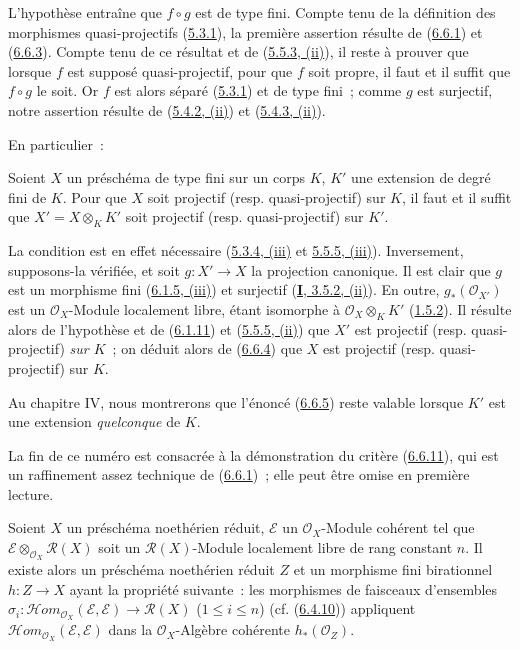 L'hypothèse entraîne que $f\circ g$ est de type fini. Compte tenu de la
définition des morphismes quasi-projectifs
(\hyperref[II.5.3.1-fr]{5.3.1}), la première assertion résulte de
(\hyperref[II.6.6.1-fr]{6.6.1}) et
(\hyperref[II.6.6.3-fr]{6.6.3}). Compte tenu de ce résultat et de
(\hyperref[II.5.5.3-fr]{5.5.3, (ii)}), il reste à prouver que lorsque $f$ est
supposé quasi-projectif, pour que $f$ soit propre, il faut et il suffit que
$f\circ g$ le soit. Or $f$ est alors séparé
(\hyperref[II.5.3.1-fr]{5.3.1}) et de type fini~; comme $g$ est surjectif,
notre assertion résulte de (\hyperref[II.5.4.2-fr]{5.4.2, (ii)}) et
(\hyperref[II.5.4.3-fr]{5.4.3, (ii)}).

En particulier~:

\begin{corollary}[6.6.5]
\label{II.6.6.5-fr}
Soient $X$ un préschéma de type fini sur un corps $K$, $K'$ une extension de
degré fini de $K$. Pour que $X$ soit projectif \textup{(resp.} quasi-projectif\textup{)} sur
$K$, il faut et il suffit que $X'=X\otimes_K K'$ soit projectif \textup{(resp.}
quasi-projectif\textup{)} sur $K'$.
\end{corollary}

La condition est en effet nécessaire
(\hyperref[II.5.3.4-fr]{5.3.4, (iii)} et
\hyperref[II.5.5.5-fr]{5.5.5, (iii)}). Inversement, supposons-la vérifiée,
et soit $g:X'\to X$ la projection canonique. Il est clair que $g$ est un
morphisme fini (\hyperref[II.6.1.5-fr]{6.1.5, (iii)}) et surjectif
(\hyperref[I.3.5.2-fr]{\textbf{I}, 3.5.2, (ii)}). En outre,
$g_*(\mathcal{O}_{X'})$ est un $\mathcal{O}_X$-Module localement libre, étant
isomorphe à $\mathcal{O}_X\otimes_K K'$
(\hyperref[II.1.5.2-fr]{1.5.2}). Il résulte alors de l'hypothèse et de
(\hyperref[II.6.1.11-fr]{6.1.11}) et
(\hyperref[II.5.5.5-fr]{5.5.5, (ii)}) que $X'$ est projectif (resp.
quasi-projectif) \emph{sur $K$}~; on déduit alors de
(\hyperref[II.6.6.4-fr]{6.6.4}) que $X$ est projectif (resp.
quasi-projectif) sur $K$.

Au chapitre IV, nous montrerons que l'énoncé
(\hyperref[II.6.6.5-fr]{6.6.5}) reste valable lorsque $K'$ est une extension
\emph{quelconque} de $K$.

La fin de ce numéro est consacrée à la démonstration du critère
(\hyperref[II.6.6.11-fr]{6.6.11}), qui est un raffinement assez technique de
(\hyperref[II.6.6.1-fr]{6.6.1})~; elle peut être omise en première lecture.

\begin{lemma}[6.6.6]
\label{II.6.6.6-fr}
Soient $X$ un préschéma noethérien réduit, $\mathcal{E}$ un
$\mathcal{O}_X$-Module cohérent tel que
$\mathcal{E}\otimes_{\mathcal{O}_X}\mathcal{R}(X)$ soit un
$\mathcal{R}(X)$-Module localement libre de rang constant $n$. Il existe
alors un préschéma noethérien réduit $Z$ et un morphisme fini birationnel
$h:Z\to X$ ayant la propriété suivante~: les morphismes de faisceaux
d'ensembles
$\sigma_i:\mathcal{H}om_{\mathcal{O}_X}(\mathcal{E},\mathcal{E})
\to\mathcal{R}(X)$ \textup{($1\leq i\leq n$)}
\textup{(cf. (\hyperref[II.6.4.10-fr]{6.4.10}))} appliquent
$\mathcal{H}om_{\mathcal{O}_X}(\mathcal{E},\mathcal{E})$ dans la
$\mathcal{O}_X$-Algèbre cohérente $h_*(\mathcal{O}_Z)$.
\end{lemma}

